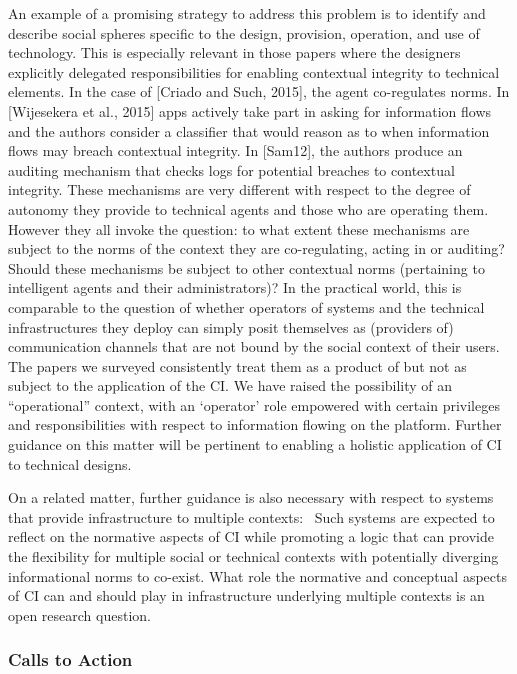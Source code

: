 \documentclass[../thesis.tex]{subfiles}
\begin{document}
An example of a promising strategy to address this problem is to
identify and describe social spheres specific to the design, provision,
operation, and use of technology. This is especially relevant in those
papers where the designers explicitly delegated responsibilities for
enabling contextual integrity to technical elements. In the case of
[Criado and Such, 2015], the agent co-regulates norms. In [Wijesekera
et al., 2015] apps actively take part in asking for information flows
and the authors consider a classifier that would reason as to when
information flows may breach contextual integrity. In [Sam12], the
authors produce an auditing mechanism that checks logs for potential
breaches to contextual integrity. These mechanisms are very different
with respect to the degree of autonomy they provide to technical agents
and those who are operating them. However they all invoke the question:
to what extent these mechanisms are subject to the norms of the context
they are co-regulating, acting in or auditing? Should these mechanisms
be subject to other contextual norms (pertaining to intelligent agents
and their administrators)? In the practical world, this is comparable
to the question of whether operators of systems and the technical
infrastructures they deploy can simply posit themselves as (providers
of) communication channels that are not bound by the social context of
their users. The papers we surveyed consistently treat them as a
product of but not as subject to the application of the CI. We have
raised the possibility of an
``operational'' context, with an
`operator' role empowered with certain
privileges and responsibilities with respect to information flowing on
the platform. Further guidance on this matter will be pertinent to
enabling a holistic application of CI to technical designs.

On a related matter, further guidance is also necessary with respect to
systems that provide infrastructure to multiple contexts: \ Such
systems are expected to reflect on the normative aspects of CI while
promoting a logic that can provide the flexibility for multiple social
or technical contexts with potentially diverging informational norms to
co-exist. What role the normative and conceptual aspects of CI can and
should play in infrastructure underlying multiple contexts is an open
research question.

\subsubsection{Calls to Action}
\label{CI5.1.2}
\end{document}
